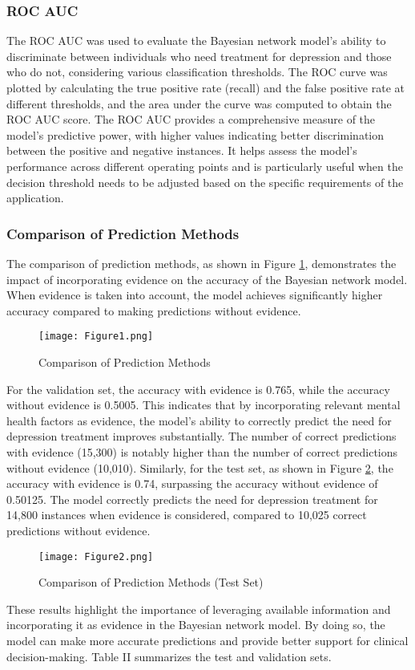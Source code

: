 \documentclass[conference]{IEEEtran}
\begin{document}
\subsubsection{ROC AUC}
The ROC AUC was used to evaluate the Bayesian network model's ability to discriminate between individuals who need treatment for depression and those who do not, considering various classification thresholds. The ROC curve was plotted by calculating the true positive rate (recall) and the false positive rate at different thresholds, and the area under the curve was computed to obtain the ROC AUC score.
The ROC AUC provides a comprehensive measure of the model's predictive power, with higher values indicating better discrimination between the positive and negative instances. It helps assess the model's performance across different operating points and is particularly useful when the decision threshold needs to be adjusted based on the specific requirements of the application.

\subsubsection{Comparison of Prediction Methods}
The comparison of prediction methods, as shown in Figure \ref{fig:prediction_methods}, demonstrates the impact of incorporating evidence on the accuracy of the Bayesian network model. When evidence is taken into account, the model achieves significantly higher accuracy compared to making predictions without evidence.
\begin{figure}[h]
\centering
\texttt{[image: Figure1.png]}
\caption{Comparison of Prediction Methods}
\label{fig:prediction_methods}
\end{figure}
For the validation set, the accuracy with evidence is 0.765, while the accuracy without evidence is 0.5005. This indicates that by incorporating relevant mental health factors as evidence, the model's ability to correctly predict the need for depression treatment improves substantially. The number of correct predictions with evidence (15,300) is notably higher than the number of correct predictions without evidence (10,010).
Similarly, for the test set, as shown in Figure \ref{fig:prediction_methods_test}, the accuracy with evidence is 0.74, surpassing the accuracy without evidence of 0.50125. The model correctly predicts the need for depression treatment for 14,800 instances when evidence is considered, compared to 10,025 correct predictions without evidence.
\begin{figure}[h]
\centering
\texttt{[image: Figure2.png]}
\caption{Comparison of Prediction Methods (Test Set)}
\label{fig:prediction_methods_test}
\end{figure}
These results highlight the importance of leveraging available information and incorporating it as evidence in the Bayesian network model. By doing so, the model can make more accurate predictions and provide better support for clinical decision-making. Table II summarizes the test and validation sets.
\end{document}

